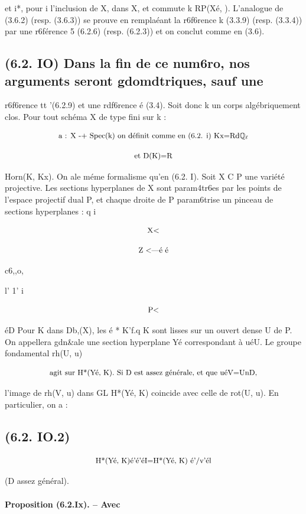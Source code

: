 \documentclass[11pt]{article}
\theoremstyle{remark}
\begin{document}
et i*, pour i l'inclusion de X, dans X, et commute k RP(Xé, ). L'analogue de (3.6.2) (resp. (3.6.3)) se prouve en remplaéant la r6f6rence k (3.3.9) (resp. (3.3.4)) par une r6férence 5 (6.2.6) (resp. (6.2.3)) et on conclut comme en (3.6).

\subsection*{(6.2. IO) Dans la fin de ce num6ro, nos arguments seront gdomdtriques, sauf une}

r6f6rence tt '(6.2.9) et une rdf6rence é (3.4). Soit donc k un corps algébriquement clos. Pour tout schéma X de type fini sur k :

\[\text{\small a : X -+ Spec(k) on définit comme en (6.2. i) Kx=Rd\(\mathbb{Q}_{\ell}\)}\]

\[\text{\small et D(K)=R}\]

Horn(K, Kx). On ale méme formalisme qu'en (6.2. I). Soit X C P une variété projective. Les sections hyperplanes de X sont param4tr6es par les points de l'espace projectif dual P, et chaque droite de P param6trise un pinceau de sections hyperplanes : q i

\[\text{\small X<}\]

\[\text{\small Z <---é é}\]

c6,,o,

l' 1' i

\[\text{\small P<}\]

éD Pour K dans Db,(X), les é * K'f.q K sont lisses sur un ouvert dense U de P. On appellera gdn\&ale une section hyperplane Yé correspondant à uéU. Le groupe fondamental rh(U, u)

\[\text{\small agit sur H*(Yé, K). Si D est assez générale, et que uéV=UnD,}\]

l'image de rh(V, u) dans GL H*(Yé, K) coincide avec celle de rot(U, u). En particulier, on a :

\subsection*{(6.2. IO.2)}

\[\text{\small H*(Yé, K)é'é'éI=H*(Yé, K) é'/v'él}\]

(D assez général).

\paragraph{Proposition (6.2.Ix). -- Avec}
\end{document}
